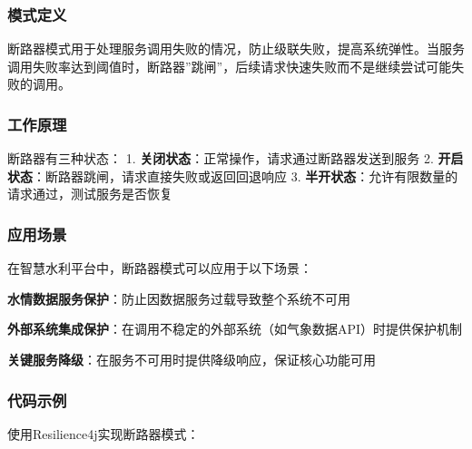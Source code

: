 \subsubsection{模式定义}\label{ux6a21ux5f0fux5b9aux4e49-3}

断路器模式用于处理服务调用失败的情况，防止级联失败，提高系统弹性。当服务调用失败率达到阈值时，断路器''跳闸''，后续请求快速失败而不是继续尝试可能失败的调用。

\subsubsection{工作原理}\label{ux5de5ux4f5cux539fux7406-3}

断路器有三种状态： 1.
\textbf{关闭状态}：正常操作，请求通过断路器发送到服务 2.
\textbf{开启状态}：断路器跳闸，请求直接失败或返回回退响应 3.
\textbf{半开状态}：允许有限数量的请求通过，测试服务是否恢复

\subsubsection{应用场景}\label{ux5e94ux7528ux573aux666f-3}

在智慧水利平台中，断路器模式可以应用于以下场景：

\textbf{水情数据服务保护}：防止因数据服务过载导致整个系统不可用

\textbf{外部系统集成保护}：在调用不稳定的外部系统（如气象数据API）时提供保护机制

\textbf{关键服务降级}：在服务不可用时提供降级响应，保证核心功能可用

\subsubsection{代码示例}\label{ux4ee3ux7801ux793aux4f8b-3}

使用Resilience4j实现断路器模式：

